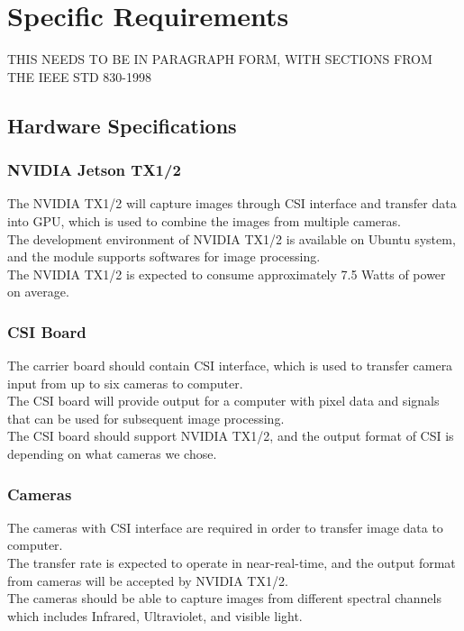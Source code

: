 \documentclass[letterpaper,10pt,serif,draftclsnofoot,onecolumn,compsoc,titlepage]{IEEEtran}
\begin{document}
\section{Specific Requirements}
THIS NEEDS TO BE IN PARAGRAPH FORM, WITH SECTIONS FROM THE IEEE STD 830-1998\\
\subsection{Hardware Specifications}
\subsubsection{NVIDIA Jetson TX1/2}
	The NVIDIA TX1/2 will capture images through CSI interface and transfer data into GPU, which is used to combine the images from multiple cameras.\\ 
	The development environment of NVIDIA TX1/2 is available on Ubuntu system, and the module supports softwares for image processing.\\
	The NVIDIA TX1/2 is expected to consume approximately 7.5 Watts of power on average.\\

\subsubsection{CSI Board}
	The carrier board should contain CSI interface, which is used to transfer camera input from up to six cameras to computer.\\
	The CSI board will provide output for a computer with pixel data and signals that can be used for subsequent image processing.\\
	The CSI board should support NVIDIA TX1/2, and the output format of CSI is depending on what cameras we chose.\\

\subsubsection{Cameras}
	The cameras with CSI interface are required in order to transfer image data to computer.\\
	The transfer rate is expected to operate in near-real-time, and the output format from cameras will be accepted by NVIDIA TX1/2.\\
	The cameras should be able to capture images from different spectral channels which includes Infrared, Ultraviolet, and visible light.\\
\end{document}

